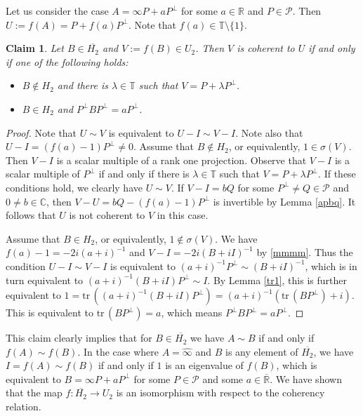 \documentclass[10pt]{amsart}
\newtheorem{claim}[theorem]{Claim}
\theoremstyle{definition}
\theoremstyle{remark}
\numberwithin{subsection}{section}
\numberwithin{equation}{section}
\newcommand\cP{{\mathcal{P}}}
\newcommand\bR{{\mathbb{R}}}
\newcommand\oH{{\overline{H_2}}}
\newcommand\oi{{\widehat{\infty}}}
\newcommand\oR{{\overline{\mathbb{R}}}}
\begin{document}
Let us consider the case $A= \infty P+a P^{\perp}$ for some $a \in \bR$ and $P \in \cP$. 
Then $U:=f(A) = P+f(a)P^\perp$. Note that $f(a)\in \mathbb{T}\setminus\{1\}$.
\begin{claim}\label{uv}
Let $B\in \oH$ and $V:=f(B)\in U_2$. 
Then $V$ is coherent to $U$ if and only if one of the following holds: 
\begin{itemize}
\item $B\notin H_2$ and there is $\lambda\in \mathbb{T}$ such that $V=P+\lambda P^\perp$. 
\item $B\in H_2$ and $P^\perp BP^\perp = aP^\perp$. 
\end{itemize}
\end{claim}
\begin{proof}
Note that  $U\sim V$ is equivalent to $U-I\sim V-I$. Note also that $U-I= (f(a)-1)P^\perp\neq 0$. 
Assume that $B\notin H_2$, or equivalently, $1\in \sigma(V)$. 
Then $V-I$ is a scalar multiple of a rank one projection.   
Observe that $V-I$ is a scalar multiple of $P^\perp$ if and only if there is $\lambda\in \mathbb{T}$ such that $V=P+\lambda P^\perp$. 
If these conditions hold, we clearly have $U\sim V$. 
If $V-I=bQ$ for some $P^\perp\neq Q\in \mathcal{P}$ and $0\neq b\in \mathbb{C}$, then $V-U=bQ- (f(a)-1)P^\perp$ is invertible by Lemma \ref{apbq}. 
It follows that $U$ is not coherent to $V$ in this case. 

Assume that $B\in H_2$, or equivalently, $1\notin \sigma(V)$. 
We have $f(a)-1=-2i(a+i)^{-1}$ and $V-I= -2i(B+iI)^{-1}$ by \eqref{mmmm}.
Thus the condition $U-I\sim V-I$ is equivalent to $(a+i)^{-1}P^\perp\sim (B+iI)^{-1}$, which is in turn equivalent to $(a+i)^{-1}(B+iI)P^\perp \sim I$.
By Lemma \ref{tr1}, this is further equivalent to $1=\mathrm{tr}\, ((a+i)^{-1}(B+iI)P^\perp) = (a+i)^{-1}(\mathrm{tr}\,(BP^\perp) +i)$. 
This is equivalent to $\mathrm{tr}\,(BP^\perp) =a$, which means $P^\perp BP^\perp =aP^\perp$.
\end{proof}

This claim clearly implies that for $B\in \oH$ we have $A\sim B$ if and only if $f(A)\sim f(B)$. 
In the case where $A = {\oi}$ and $B$ is any element of $\oH$, we have $I = f(A) \sim f(B)$ if and only if $1$ is an eigenvalue of $f(B)$, which is equivalent to $B= \infty P+aP^{\perp}$ for some $P\in \cP$ and some $a \in {\oR}$.
We have shown that the map $f\colon \oH \to U_2$ is an isomorphism with respect to the coherency relation. 
\end{document}
